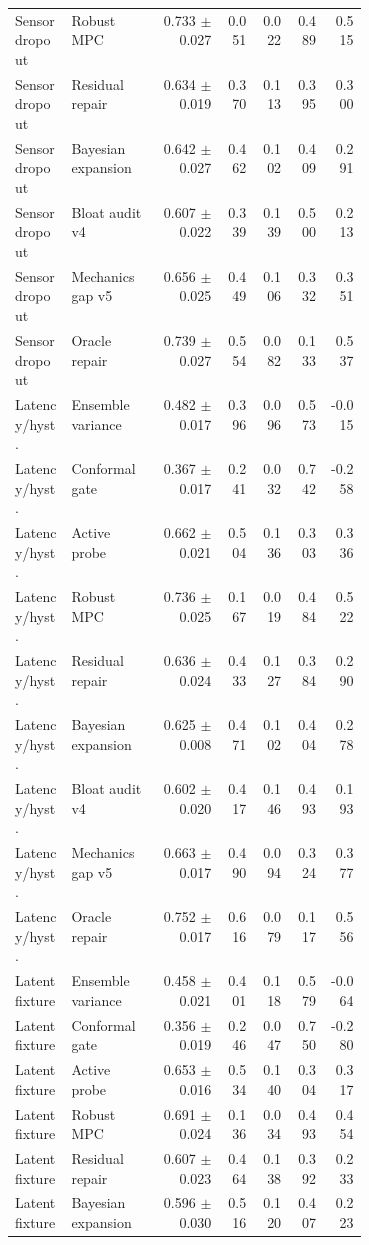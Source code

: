 \documentclass{article}
\begin{document}
\begin{center}
\begin{longtable}{p{0.16\linewidth}p{0.25\linewidth}rrrrr}
Sensor dropout & Robust MPC & 0.733 $\pm$ 0.027 & 0.051 & 0.022 & 0.489 & 0.515\\
Sensor dropout & Residual repair & 0.634 $\pm$ 0.019 & 0.370 & 0.113 & 0.395 & 0.300\\
Sensor dropout & Bayesian expansion & 0.642 $\pm$ 0.027 & 0.462 & 0.102 & 0.409 & 0.291\\
Sensor dropout & Bloat audit v4 & 0.607 $\pm$ 0.022 & 0.339 & 0.139 & 0.500 & 0.213\\
Sensor dropout & Mechanics gap v5 & 0.656 $\pm$ 0.025 & 0.449 & 0.106 & 0.332 & 0.351\\
Sensor dropout & Oracle repair & 0.739 $\pm$ 0.027 & 0.554 & 0.082 & 0.133 & 0.537\\
Latency/hyst. & Ensemble variance & 0.482 $\pm$ 0.017 & 0.396 & 0.096 & 0.573 & -0.015\\
Latency/hyst. & Conformal gate & 0.367 $\pm$ 0.017 & 0.241 & 0.032 & 0.742 & -0.258\\
Latency/hyst. & Active probe & 0.662 $\pm$ 0.021 & 0.504 & 0.136 & 0.303 & 0.336\\
Latency/hyst. & Robust MPC & 0.736 $\pm$ 0.025 & 0.167 & 0.019 & 0.484 & 0.522\\
Latency/hyst. & Residual repair & 0.636 $\pm$ 0.024 & 0.433 & 0.127 & 0.384 & 0.290\\
Latency/hyst. & Bayesian expansion & 0.625 $\pm$ 0.008 & 0.471 & 0.102 & 0.404 & 0.278\\
Latency/hyst. & Bloat audit v4 & 0.602 $\pm$ 0.020 & 0.417 & 0.146 & 0.493 & 0.193\\
Latency/hyst. & Mechanics gap v5 & 0.663 $\pm$ 0.017 & 0.490 & 0.094 & 0.324 & 0.377\\
Latency/hyst. & Oracle repair & 0.752 $\pm$ 0.017 & 0.616 & 0.079 & 0.117 & 0.556\\
Latent fixture & Ensemble variance & 0.458 $\pm$ 0.021 & 0.401 & 0.118 & 0.579 & -0.064\\
Latent fixture & Conformal gate & 0.356 $\pm$ 0.019 & 0.246 & 0.047 & 0.750 & -0.280\\
Latent fixture & Active probe & 0.653 $\pm$ 0.016 & 0.534 & 0.140 & 0.304 & 0.317\\
Latent fixture & Robust MPC & 0.691 $\pm$ 0.024 & 0.136 & 0.034 & 0.493 & 0.454\\
Latent fixture & Residual repair & 0.607 $\pm$ 0.023 & 0.464 & 0.138 & 0.392 & 0.233\\
Latent fixture & Bayesian expansion & 0.596 $\pm$ 0.030 & 0.516 & 0.120 & 0.407 & 0.223\\

\end{longtable}
\end{center}
\end{document}
